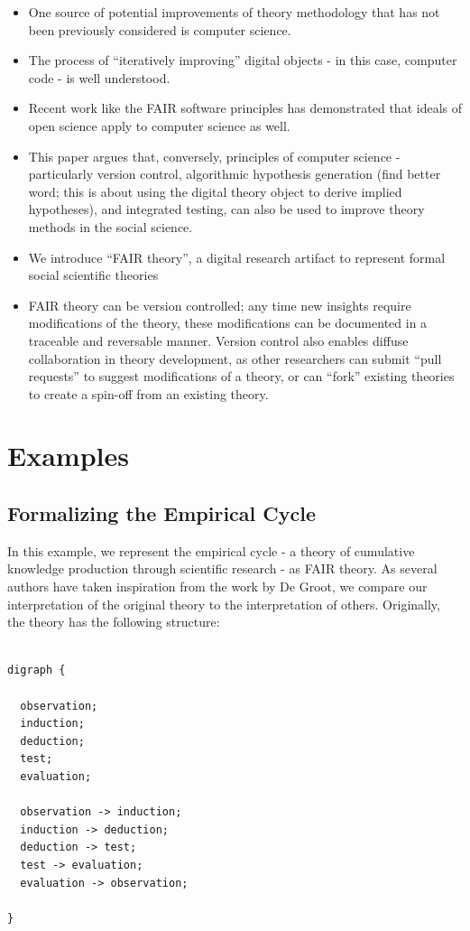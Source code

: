 \documentclass[
  man]{apa6}
\providecommand{\tightlist}{%
  \setlength{\itemsep}{0pt}\setlength{\parskip}{0pt}}
\begin{document}
\begin{itemize}
\tightlist
\item
  One source of potential improvements of theory methodology that has not been previously considered is computer science.
\item
  The process of ``iteratively improving'' digital objects - in this case, computer code - is well understood.
\item
  Recent work like the FAIR software principles has demonstrated that ideals of open science apply to computer science as well.
\item
  This paper argues that, conversely, principles of computer science - particularly version control, algorithmic hypothesis generation (find better word; this is about using the digital theory object to derive implied hypotheses), and integrated testing, can also be used to improve theory methods in the social science.
\item
  We introduce ``FAIR theory'', a digital research artifact to represent formal social scientific theories
\item
  FAIR theory can be version controlled; any time new insights require modifications of the theory, these modifications can be documented in a traceable and reversable manner. Version control also enables diffuse collaboration in theory development, as other researchers can submit ``pull requests'' to suggest modifications of a theory, or can ``fork'' existing theories to create a spin-off from an existing theory.
\end{itemize}

\section{Examples}\label{examples}

\subsection{Formalizing the Empirical Cycle}\label{formalizing-the-empirical-cycle}

In this example, we represent the empirical cycle - a theory of cumulative knowledge production through scientific research - as FAIR theory.
As several authors have taken inspiration from the work by De Groot,
we compare our interpretation of the original theory to the interpretation of others.
Originally, the theory has the following structure:

\begin{verbatim}

digraph {

  observation;
  induction;
  deduction;
  test;
  evaluation;
  
  observation -> induction;
  induction -> deduction;
  deduction -> test;
  test -> evaluation;
  evaluation -> observation;
  
}
\end{verbatim}
\end{document}

